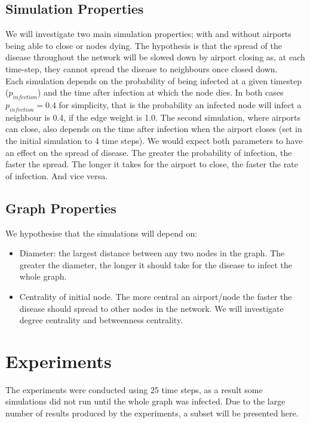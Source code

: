 \documentclass[a4paper,11pt]{article}
\begin{document}
\subsection*{Simulation Properties}
We will investigate two main simulation properties; with and without airports being able to close or nodes dying. The hypothesis is that the spread of the disease throughout the network will be slowed down by airport closing as, at each time-step, they cannot spread the disease to neighbours once closed down. \\
Each simulation depends on the probability of being infected at a given timestep ($p_{infection}$) and the time after infection at which the node dies. In both cases $p_{infection} = 0.4$ for simplicity, that is the probability an infected node will infect a neighbour is 0.4, if the edge weight is 1.0. The second simulation, where airports can close, also depends on the time after infection when the airport closes (set in the initial simulation to 4 time steps). We would expect both parameters to have an effect on the spread of disease. The greater the probability of infection, the faster the spread. The longer it takes for the airport to close, the faster the rate of infection. And vice versa. 

\subsection*{Graph Properties}
We hypothesise that the simulations will depend on:

\begin{itemize}
\item Diameter: the largest distance between any two nodes in the graph. The greater the diameter, the longer it should take for the disease to infect the whole graph.
\item Centrality of initial node. The more central an airport/node the faster the disease should spread to other nodes in the network. We will investigate degree centrality and betweenness centrality.
\end{itemize}

\section{Experiments}

The experiments were conducted using 25 time steps, as a result some simulations did not run until the whole graph was infected. Due to the large number of results produced by the experiments, a subset will be presented here.
\end{document}
